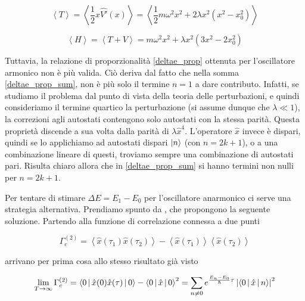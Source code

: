 \documentclass[11pt, a4paper]{article}
\begin{document}
\begin{equation}
  \left\langle T \right\rangle =
  \left\langle \frac{1}{2} x \hat{V'}(x) \right\rangle =
  \left\langle \frac{1}{2} m \omega^2 x^2 + 2 \lambda x^2 \left(x^2 - x_0^2\right) \right\rangle
\end{equation}

\begin{equation}
  \left\langle H \right\rangle = \left\langle T + V \right\rangle =
   m \omega^2 x^2 + \lambda x^2 \left(3 x^2 - 2 x_0^2\right)
\end{equation}

Tuttavia, la relazione di proporzionalità \eqref{deltae_prop} ottenuta per l'oscillatore armonico non è più valida.
Ciò deriva dal fatto che nella somma \eqref{deltae_prop_sum}, non è più solo il termine $n=1$ a dare contributo.
Infatti, se studiamo il problema dal punto di vista della teoria delle perturbazioni, e quindi consideriamo il termine quartico
la perturbazione (si assume dunque che $\lambda \ll 1$), la correzioni agli autostati contengono solo autostati con la stessa parità.
Questa proprietà discende a sua volta dalla parità di $\lambda \hat{x}^4$.
L'operatore $\hat{x}$ invece è dispari, quindi se lo applichiamo ad autostati dispari $\Ket{n}$ (con $n = 2 k + 1$), o a una combinazione lineare di questi, troviamo sempre una combinazione
di autostati pari. Risulta chiaro allora che in \eqref{deltae_prop_sum} si hanno termini non nulli per $n = 2 k + 1$.

Per tentare di stimare $\Delta E = E_1 - E_0$ per l'oscillatore anarmonico ci serve una strategia alternativa.
Prendiamo spunto da \cite{creutz_statistical_1981}, che propongono la seguente soluzione.
Partendo alla funzione di correlazione connessa a due punti

\begin{equation}
  \Gamma_c^{(2)} = \left\langle \hat{x}(\tau_1) \hat{x}(\tau_2) \right\rangle - \left\langle \hat{x}(\tau_1) \right\rangle \left\langle \hat{x}(\tau_2) \right\rangle
\end{equation}

arrivano per prima cosa allo stesso risultato già visto

\begin{equation}
  \lim_{T \to \infty} \Gamma_c^{(2)} = \Braket{0 | \hat{x}(0) \hat{x}(\tau) | 0} - \Braket{0 | \hat{x} | 0}^2 =
  \sum_{n \ne 0} e^{\frac{E_n - E_0}{\hbar} \tau} \left|\Braket{0 | \hat{x} | n}\right|^2
\end{equation}
\end{document}
